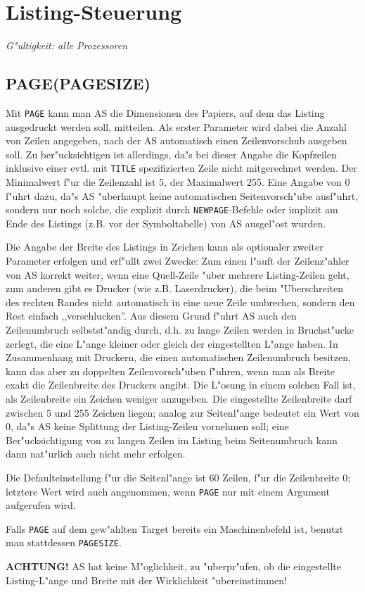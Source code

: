 \documentclass[12pt,a4paper,twoside]{report}
\makeatletter
\newcommand{\bb}[1]{{\bf #1}}
\newcommand{\tty}[1]{{\tt #1}}
\newcommand{\ttindex}[1]{\index{#1@{\tt #1}}}
\makeatother
\begin{document}
{%

\section{Listing-Steuerung}

{\em G"ultigkeit: alle Prozessoren}


\subsection{PAGE(PAGESIZE)}
\ttindex{PAGE}\ttindex{PAGESIZE}

Mit \tty{PAGE} kann man AS die Dimensionen des Papiers, auf dem das
Listing ausgedruckt werden soll, mitteilen.  Als erster Parameter
wird dabei die Anzahl von Zeilen angegeben, nach der AS automatisch
einen Zeilenvorschub ausgeben soll.  Zu ber"ucksichtigen ist allerdings,
da"s bei dieser Angabe die Kopfzeilen inklusive einer evtl. mit \tty{TITLE}
spezifizierten Zeile nicht mitgerechnet werden.  Der Minimalwert f"ur
die Zeilenzahl ist 5, der Maximalwert 255.  Eine Angabe von 0 f"uhrt dazu,
da"s AS "uberhaupt keine automatischen Seitenvorsch"ube ausf"uhrt, sondern
nur noch solche, die explizit durch \tty{NEWPAGE}-Befehle oder implizit am
Ende des Listings (z.B. vor der Symboltabelle) von AS ausgel"ost
wurden.
\par
Die Angabe der Breite des Listings in Zeichen kann als optionaler
zweiter Parameter erfolgen und erf"ullt zwei Zwecke: Zum einen l"auft
der Zeilenz"ahler von AS korrekt weiter, wenn eine Quell-Zeile "uber mehrere
Listing-Zeilen geht, zum anderen gibt es Drucker (wie z.B. Laserdrucker),
die beim "Uberschreiten des rechten Randes nicht automatisch in eine neue
Zeile umbrechen, sondern den Rest einfach ,,verschlucken''.  Aus diesem
Grund f"uhrt AS auch den Zeilenumbruch selbstst"andig durch, d.h. zu lange
Zeilen werden in Bruchst"ucke zerlegt, die eine L"ange kleiner oder
gleich der eingestellten L"ange haben.  In Zusammenhang mit Druckern, die
einen automatischen Zeilenumbruch besitzen, kann das aber zu doppelten
Zeilenvorsch"uben f"uhren, wenn man als Breite exakt die Zeilenbreite des
Druckers angibt.  Die L"osung in einem solchen Fall ist, als Zeilenbreite
ein Zeichen weniger anzugeben.  Die eingestellte Zeilenbreite darf zwischen
5 und 255 Zeichen liegen; analog zur Seitenl"ange bedeutet ein Wert von 0,
da"s AS keine Splittung der Listing-Zeilen vornehmen soll; eine
Ber"ucksichtigung von zu langen Zeilen im Listing beim Seitenumbruch kann
dann nat"urlich auch nicht mehr erfolgen.
\par
Die Defaulteinstellung f"ur die Seitenl"ange ist 60 Zeilen, f"ur die
Zeilenbreite 0; letztere Wert wird auch angenommen, wenn \tty{PAGE} nur mit
einem Argument aufgerufen wird.
\par
Falls \tty{PAGE} auf dem gew"ahlten Target bereits ein
Maschinenbefehl ist, benutzt man stattdessen \tty{PAGESIZE}.
\par
\bb{ACHTUNG!} AS hat keine M"oglichkeit, zu "uberpr"ufen, ob die
eingestellte Listing-L"ange und Breite mit der Wirklichkeit "ubereinstimmen!

}
\end{document}
